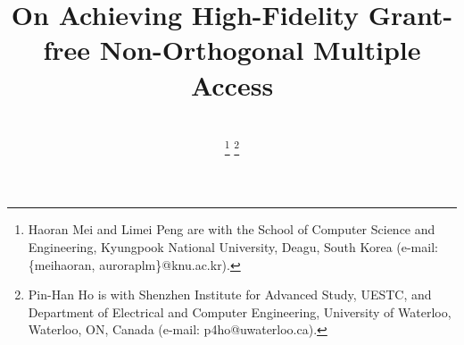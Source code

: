 \documentclass[a4paper]{IEEEtran}
\begin{document}
\title{On Achieving High-Fidelity Grant-free Non-Orthogonal Multiple Access}

\author{\\
\thanks{Haoran Mei and Limei Peng are with the School of Computer Science and Engineering, Kyungpook National University, Deagu, South Korea (e-mail: \{meihaoran, auroraplm\}@knu.ac.kr).}%
\thanks{Pin-Han Ho is with Shenzhen Institute for Advanced Study, UESTC, and Department of Electrical and Computer Engineering, University of Waterloo, Waterloo, ON, Canada (e-mail: p4ho@uwaterloo.ca).}%


}
\end{document}
